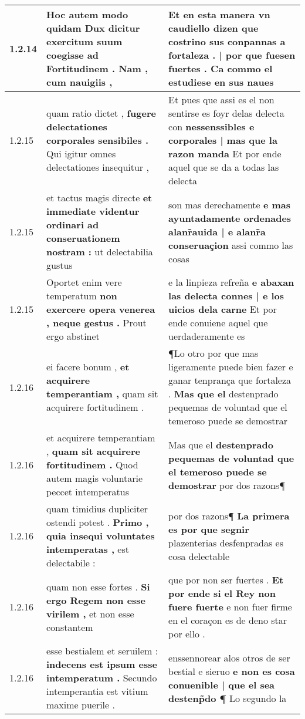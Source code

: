 \begin{tabular}{|p{1cm}|p{6.5cm}|p{6.5cm}|}
1.2.14 & Hoc autem modo quidam Dux dicitur exercitum suum \textbf{ coegisse ad Fortitudinem . } Nam , cum nauigiis , & Et en esta manera vn caudiello dizen \textbf{ que costrino sus conpannas a fortaleza . | por que fuesen fuertes . } Ca commo el estudiese en sus naues \\\hline
1.2.15 & quam ratio dictet , \textbf{ fugere delectationes corporales sensibiles . } Qui igitur omnes delectationes insequitur , & Et pues que assi es el non sentirse es foyr delas delecta con \textbf{ nessenssibles e corporales | mas que la razon manda } Et por ende aquel que se da a todas las delecta \\\hline
1.2.15 & et tactus magis directe \textbf{ et immediate videntur ordinari ad conseruationem nostram : } ut delectabilia gustus & son mas derechamente \textbf{ e mas ayuntadamente ordenades alanr̃auida | e alanr̃a conseruaçion } assi commo las cosas \\\hline
1.2.15 & Oportet enim vere temperatum \textbf{ non exercere opera venerea , neque gestus . } Prout ergo abstinet & e la linpieza refreña \textbf{ e abaxan las delecta connes | e los uicios dela carne } Et por ende conuiene aquel que uerdaderamente es \\\hline
1.2.16 & ei facere bonum , \textbf{ et acquirere temperantiam , } quam sit acquirere fortitudinem . & ¶Lo otro por que mas ligeramente puede bien fazer e ganar tenprança que fortaleza . \textbf{ Mas que el } destenprado pequemas de voluntad que el temeroso puede se demostrar \\\hline
1.2.16 & et acquirere temperantiam , \textbf{ quam sit acquirere fortitudinem . } Quod autem magis voluntarie peccet intemperatus & Mas que el \textbf{ destenprado pequemas de voluntad que el temeroso puede se demostrar } por dos razons¶ \\\hline
1.2.16 & quam timidius dupliciter ostendi potest . \textbf{ Primo , quia insequi voluntates intemperatas , } est delectabile : & por dos razons¶ \textbf{ La primera es por que segnir } plazenterias desfenpradas es cosa delectable \\\hline
1.2.16 & quam non esse fortes . \textbf{ Si ergo Regem non esse virilem , } et non esse constantem & que por non ser fuertes . \textbf{ Et por ende si el Rey non fuere fuerte } e non fuer firme en el coraçon es de deno star por ello . \\\hline
1.2.16 & esse bestialem et seruilem : \textbf{ indecens est ipsum esse intemperatum . } Secundo intemperantia est vitium maxime puerile . & enssennorear alos otros de ser bestial e sieruo \textbf{ e non es cosa conuenible | que el sea destenp̃do ¶ } Lo segundo la \\\hline

\end{tabular}
